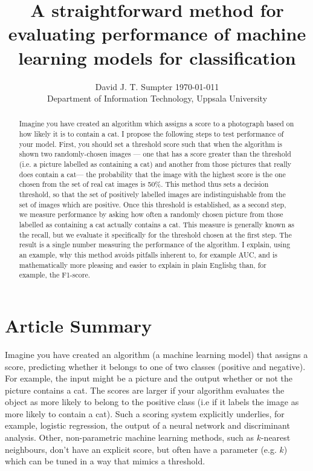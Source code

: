 \documentclass{article}
\title{A straightforward method for evaluating performance of machine learning models for classification}
\author{David J. T. Sumpter
  \today1\\
  Department of Information Technology, Uppsala University\\
}
\begin{document}

\maketitle

\begin{abstract}
Imagine you have created an algorithm which assigns a score to a photograph based on how likely it is to contain a cat.  I propose the following steps to test performance of your model. First, you should set a threshold score such that when the algorithm is shown two randomly-chosen images --- one that has a score greater than the threshold (i.e. a picture labelled as containing a cat) and another from those pictures that really does contain a cat--- the probability that the image with the highest score is the one chosen from the set of real cat images is 50\%. This method thus sets a decision threshold, so that the set of positively labelled images are indistinguishable from the set of images which are positive. Once this threshold is established, as a second step, we measure performance by asking how often a randomly chosen picture from those labelled as containing a cat actually contains a cat. This measure is generally known as the recall, but we evaluate it specifically for the threshold chosen at the first step. The result is a single number measuring the performance of the algorithm. I explain, using an example, why this method avoids pitfalls inherent to, for example AUC, and is mathematically more pleasing and easier to explain in plain Englishg than, for example, the F1-score.
\end{abstract}

\section{Article Summary}

Imagine you have created an algorithm (a machine learning model) that assigns a score, predicting whether it belongs to one of two classes (positive and negative). For example, the input might be a picture and the output whether or not the picture contains a cat. The scores are larger if your algorithm evaluates the object as more likely to belong to the positive class (i.e if it labels the image as more likely to contain a cat). Such a scoring system explicitly underlies, for example, logistic regression, the output of a neural network and discriminant analysis. Other, non-parametric machine learning methods, such as $k$-nearest neighbours, don't have an explicit score, but often have a parameter (e.g. $k$) which can be tuned in a way that mimics a threshold. 
\end{document}
